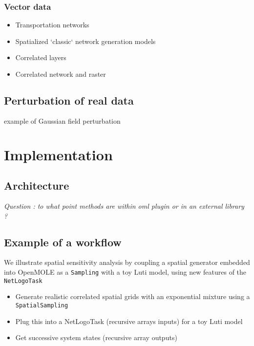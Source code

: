 \subsubsection{Vector data}

\begin{itemize}
	\item Transportation networks
	\item Spatialized `classic` network generation models
	\item Correlated layers	
	\item Correlated network and raster 
\end{itemize}



\subsection{Perturbation of real data}

\cite{constantine2012method} example of Gaussian field perturbation







\section{Implementation}


\subsection{Architecture}

\textit{Question : to what point methods are within oml plugin or in an external library ?}


\subsection{Example of a workflow}

We illustrate spatial sensitivity analysis by coupling a spatial generator embedded into OpenMOLE as a \texttt{Sampling} with a toy Luti model, using new features of the \texttt{NetLogoTask}

\begin{itemize}
	\item Generate realistic correlated spatial grids with an exponential mixture using a \texttt{SpatialSampling}
	\item Plug this into a NetLogoTask (recursive arrays inputs) for a toy Luti model
	\item Get successive system states (recursive array outputs)
\end{itemize}


